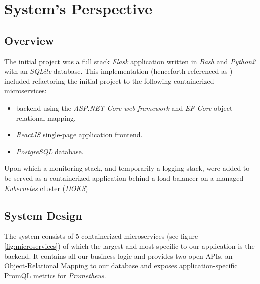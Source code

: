 \section{System's Perspective}
\label{sec:systems_perspective}

\subsection{Overview}
\label{subsec:systems_perspective_overview}
The initial project was a full stack \textit{Flask} application written in \textit{Bash} and \textit{Python2} with an \textit{SQLite} database. 
This implementation (henceforth referenced as \mini) included refactoring the initial project to the following containerized microservices:
\begin{itemize}
    \item \textit{\cs} backend using the \textit{ASP.NET Core web framework} and \textit{EF Core} object-relational mapping.
    \item \textit{ReactJS} single-page application frontend.
    \item \textit{PostgreSQL} database.
\end{itemize}
Upon which a monitoring stack, and temporarily a logging stack, were added to be served as a containerized application behind a load-balancer on a managed \textit{Kubernetes} cluster (\textit{DOKS})

\subsection{System Design}
\label{subsec:system_design}
The system consists of 5 containerized microservices (see figure \ref{fig:microservices}) of which the largest and most specific to our application is the \cs backend.
It contains all our business logic and provides two open APIs, an Object-Relational Mapping to our database and exposes application-specific PromQL metrics for \textit{Prometheus}. \par

